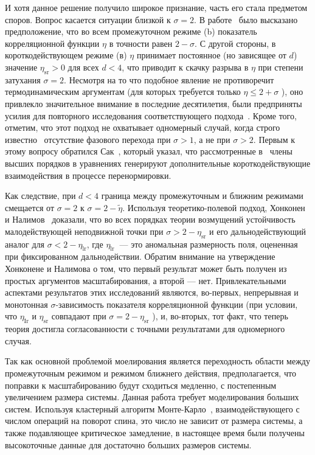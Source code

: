 И хотя данное решение получило широкое признание, часть его стала предметом споров. 
Вопрос касается ситуации близкой к $\sigma=2$.
В работе~\cite{10.1103/PhysRevLett.29.917} было высказано предположение, что во всем промежуточном режиме (b) показатель корреляционной функции $\eta$ в точности равен $2-\sigma$. 
С другой стороны, в короткодействующем режиме (в) $\eta$ принимает постоянное (но зависящее от $d$) значение $\eta_{\mathrm{sr}}>0$ для всех $d<4 $, что приводит к скачку разрыва в $\eta$ при степени затухания $\sigma=2$. 
Несмотря на то что подобное явление не противоречит термодинамическим аргументам (для которых требуется только $\eta\leq 2+\sigma$ ), оно привлекло значительное внимание в последние десятилетия, были предприняты усилия для повторного исследования соответствующего подхода~\cite{10.1103/PhysRevB.8.281, 10.1088/0305-4470/22/6/024}. 
Кроме того, отметим, что этот подход не охватывает одномерный случай, когда строго известно~\cite{10.1007/BF01654281} отсутствие фазового перехода при $\sigma>1$, а не при $\sigma>2$. 
Первым к этому вопросу обратился Сак~\cite{10.1103/PhysRevB.8.281}, который указал, что рассмотренные в~\cite{10.1103/PhysRevLett.29.917} члены высших порядков в уравнениях генерируют дополнительные короткодействующие взаимодействия в процессе перенормировки.

Как следствие, при $d<4$ граница между промежуточным и ближним режимами смещается от $\sigma=2$ к $\sigma=2-\tilde{\eta}$.
Используя теоретико-полевой подход, Хонконен и Налимов~\cite{10.1088/0305-4470/22/6/024} доказали, что во всех порядках теории возмущений устойчивость малодействующей неподвижной точки при $\sigma>2-\eta_{\mathrm{sr}}$ и его дальнодействующий аналог для $\sigma<2-\eta_{\mathrm{lr}}$, где $\eta_{\text {lr }}$ — это аномальная размерность поля, оцененная при фиксированном дальнодействии. 
Обратим внимание на утверждение Хонконене и Налимова о том, что первый результат может быть получен из простых аргументов масштабирования, а второй — нет. 
Привлекательными аспектами результатов этих исследований являются, во-первых, непрерывная и монотонная $\sigma$-зависимость показателя корреляционной функции (при условии, что $\eta_{\mathrm{Ir}}$ и $\eta_{\mathrm{sr}}$ совпадают при $\sigma=2-\eta_{\mathrm{sr}}$ ), и, во-вторых, тот факт, что теперь теория достигла согласованности с точными результатами для одномерного случая.

Так как основной проблемой моелирования является переходность области между промежуточным режимом и режимом ближнего действия, предполагается, что поправки к масштабированию будут сходиться медленно, с постепенным увеличением размера системы. 
Данная работа требует моделирования больших систем. 
Используя кластерный алгоритм Монте-Карло~\cite{10.1142/S0129183195000265}, взаимодействующего с числом операций на поворот спина, это число не зависит от размера системы, а также подавляющее критическое замедление, в настоящее время были получены высокоточные данные для достаточно больших размеров системы.

